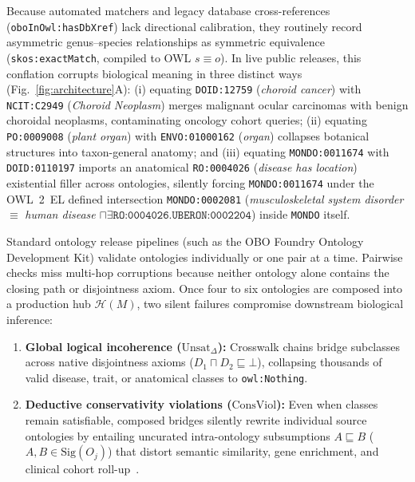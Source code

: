 \documentclass[10pt]{article}
\theoremstyle{accentdef}
\begin{document}
Because automated matchers and legacy database cross-references (\texttt{oboInOwl:hasDbXref}) lack directional calibration, they routinely record asymmetric genus--species relationships as symmetric equivalence (\texttt{skos:exactMatch}, compiled to OWL $s \equiv o$). In live public releases, this conflation corrupts biological meaning in three distinct ways (Fig.~\ref{fig:architecture}A): (i) equating \texttt{DOID:12759} (\emph{choroid cancer}) with \texttt{NCIT:C2949} (\emph{Choroid Neoplasm}) merges malignant ocular carcinomas with benign choroidal neoplasms, contaminating oncology cohort queries; (ii) equating \texttt{PO:0009008} (\emph{plant organ}) with \texttt{ENVO:01000162} (\emph{organ}) collapses botanical structures into taxon-general anatomy; and (iii) equating \texttt{MONDO:0011674} with \texttt{DOID:0110197} imports an anatomical \texttt{RO:0004026} (\emph{disease has location}) existential filler across ontologies, silently forcing \texttt{MONDO:0011674} under the OWL~2~EL defined intersection \texttt{MONDO:0002081} (\emph{musculoskeletal system disorder} $\equiv$ \emph{human disease} $\sqcap \exists\texttt{RO:0004026}.\texttt{UBERON:0002204}$) inside \texttt{MONDO} itself.

Standard ontology release pipelines (such as the OBO Foundry Ontology Development Kit) validate ontologies individually or one pair at a time. Pairwise checks miss multi-hop corruptions because neither ontology alone contains the closing path or disjointness axiom. Once four to six ontologies are composed into a production hub $\mathcal{H}(M)$, two silent failures compromise downstream biological inference:
\begin{enumerate}
  \item \textbf{Global logical incoherence ($\mathrm{Unsat}_{\Delta}$):} Crosswalk chains bridge subclasses across native disjointness axioms ($D_1 \sqcap D_2 \sqsubseteq \bot$), collapsing thousands of valid disease, trait, or anatomical classes to \texttt{owl:Nothing}.
  \item \textbf{Deductive conservativity violations ($\mathrm{ConsViol}$):} Even when classes remain satisfiable, composed bridges silently rewrite individual source ontologies by entailing uncurated intra-ontology subsumptions $A \sqsubseteq B$ ($A, B \in \mathrm{Sig}(O_j)$) that distort semantic similarity, gene enrichment, and clinical cohort roll-up~\cite{solimando2017conservativity,antunes2021conservativity}.
\end{enumerate}
\end{document}
